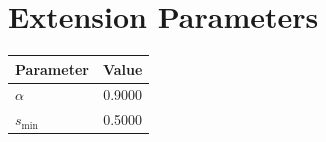 \documentclass[letter, 10pt]{article}
\begin{document}
\newpage

\section*{Extension Parameters}

\begin{tabular}{lc}

\toprule

Parameter & Value \\

\midrule

$\alpha$ & 0.9000 \\

$s_{\min}$ & 0.5000 \\

\bottomrule

\end{tabular}
\end{document}
